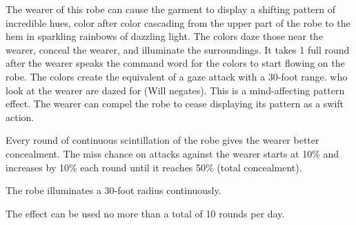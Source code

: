  The wearer of this robe can cause the garment to display a shifting pattern of incredible hues, color after color cascading from the upper part of the robe to the hem in sparkling rainbows of dazzling light. The colors daze  those near the wearer, conceal the wearer, and illuminate the surroundings. It takes 1 full round after the wearer speaks the command word for the colors to start flowing on the robe. The colors create the equivalent of a gaze attack with a 30-foot range.  who look at the wearer are dazed for  (Will negates).  This is a mind-affecting pattern effect. The wearer can compel the robe to cease displaying its pattern as a swift action.

Every round of continuous scintillation of the robe gives the wearer better concealment. The miss chance on attacks against the wearer starts at 10\% and increases by 10\% each round until it reaches 50\% (total concealment).

The robe illuminates a 30-foot radius continuously.

The effect can be used no more than a total of 10 rounds per day.

